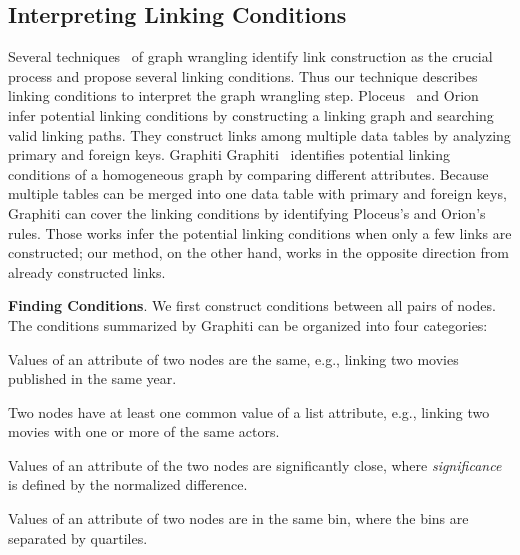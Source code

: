\subsection{Interpreting Linking Conditions}
Several techniques~\cite{DBLP:journals/ivs/LiuNS14, DBLP:journals/ivs/HeerP14, DBLP:journals/tvcg/SrinivasanPEB18} of graph wrangling identify link construction as the crucial process and propose several linking conditions.
Thus our technique describes linking conditions to interpret the graph wrangling step.
Ploceus~\cite{DBLP:journals/ivs/LiuNS14} and Orion~\cite{DBLP:journals/ivs/HeerP14} infer potential linking conditions by constructing a linking graph and searching valid linking paths. They construct links among multiple data tables by analyzing primary and foreign keys.
Graphiti
Graphiti~\cite{DBLP:journals/tvcg/SrinivasanPEB18} identifies potential linking conditions of a homogeneous graph by comparing different attributes.
Because multiple tables can be merged into one data table with primary and foreign keys, Graphiti can cover the linking conditions by identifying Ploceus's and Orion's rules.
Those works infer the potential linking conditions when only a few links are constructed;
our method, on the other hand, works in the opposite direction from already constructed links.

\textbf{Finding Conditions}. We first construct conditions between all pairs of nodes. The conditions summarized by Graphiti can be organized into four categories:
\begin{compactenum}[\textbf{C}1]
    \item Values of an attribute of two nodes are the same, e.g., linking two movies published in the same year.
    \item Two nodes have at least one common value of a list attribute, e.g., linking two movies with one or more of the same actors.
    \item Values of an attribute of the two nodes are significantly close, where \textit{significance} is defined by the normalized difference.
    \item Values of an attribute of two nodes are in the same bin, where the bins are separated by quartiles.
\end{compactenum}

